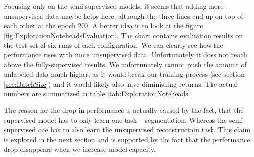 Focusing only on the semi-supervised models, it seems that adding more unsupervised data maybe helps here, although the three lines end up on top of each other at the epoch 200. A better idea is to look at the figure \ref{fig:ExplorationNoteheadsEvaluation}. The chart contains evaluation results on the test set of six runs of each configuration. We can clearly see how the performance rises with more unsupervised data. Unfortunately it does not reach above the fully-supervised results. We unfortunately cannot push the amount of unlabeled data much higher, as it would break our training process (see section \ref{sec:BatchSize}) and it would likely also have diminishing returns. The actual numbers are summarized in table \ref{tab:ExplorationNoteheads}.

The reason for the drop in performance is actually caused by the fact, that the supervised model has to only learn one task -- segmentation. Whereas the semi-supervised one has to also learn the unsupervised reconstruction task. This claim is explored in the next section and is supported by the fact that the performance drop disappears when we increase model capacity.

